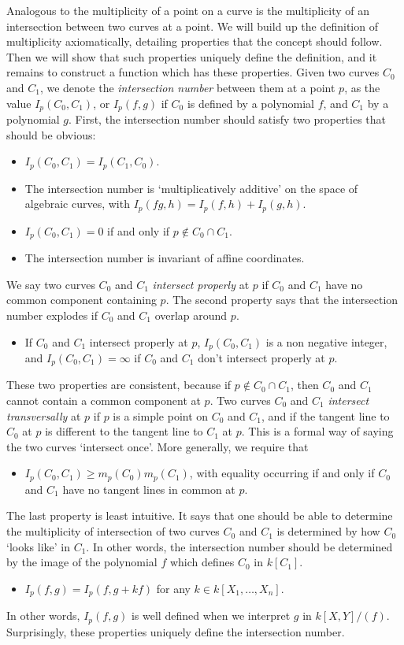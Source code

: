 Analogous to the multiplicity of a point on a curve is the multiplicity of an intersection between two curves at a point. We will build up the definition of multiplicity axiomatically, detailing properties that the concept should follow. Then we will show that such properties uniquely define the definition, and it remains to construct a function which has these properties. Given two curves $C_0$ and $C_1$, we denote the \emph{intersection number} between them at a point $p$, as the value $I_p(C_0,C_1)$, or $I_p(f,g)$ if $C_0$ is defined by a polynomial $f$, and $C_1$ by a polynomial $g$. First, the intersection number should satisfy two properties that should be obvious:
%
\begin{itemize}
    \item $I_p(C_0,C_1) = I_p(C_1,C_0)$.
    \item The intersection number is `multiplicatively additive' on the space of algebraic curves, with $I_p(fg,h) = I_p(f,h) + I_p(g,h)$.
    \item $I_p(C_0,C_1) = 0$ if and only if $p \not \in C_0 \cap C_1$.
    \item The intersection number is invariant of affine coordinates.
\end{itemize}
%
We say two curves $C_0$ and $C_1$ \emph{intersect properly} at $p$ if $C_0$ and $C_1$ have no common component containing $p$. The second property says that the intersection number explodes if $C_0$ and $C_1$ overlap around $p$.
%
\begin{itemize}
    \item If $C_0$ and $C_1$ intersect properly at $p$, $I_p(C_0,C_1)$ is a non negative integer, and $I_p(C_0,C_1) = \infty$ if $C_0$ and $C_1$ don't intersect properly at $p$.
\end{itemize}
%
These two properties are consistent, because if $p \not \in C_0 \cap C_1$, then $C_0$ and $C_1$ cannot contain a common component at $p$. Two curves $C_0$ and $C_1$ \emph{intersect transversally} at $p$ if $p$ is a simple point on $C_0$ and $C_1$, and if the tangent line to $C_0$ at $p$ is different to the tangent line to $C_1$ at $p$. This is a formal way of saying the two curves `intersect once'. More generally, we require that
%
\begin{itemize}
    \item $I_p(C_0,C_1) \geq m_p(C_0) m_p(C_1)$, with equality occurring if and only if $C_0$ and $C_1$ have no tangent lines in common at $p$.
\end{itemize}
%
The last property is least intuitive. It says that one should be able to determine the multiplicity of intersection of two curves $C_0$ and $C_1$ is determined by how $C_0$ `looks like' in $C_1$. In other words, the intersection number should be determined by the image of the polynomial $f$ which defines $C_0$ in $k[C_1]$.
%
\begin{itemize}
    \item $I_p(f,g) = I_p(f,g + kf)$ for any $k \in k[X_1, \dots, X_n]$.
\end{itemize}
%
In other words, $I_p(f,g)$ is well defined when we interpret $g$ in $k[X,Y]/(f)$. Surprisingly, these properties uniquely define the intersection number.

